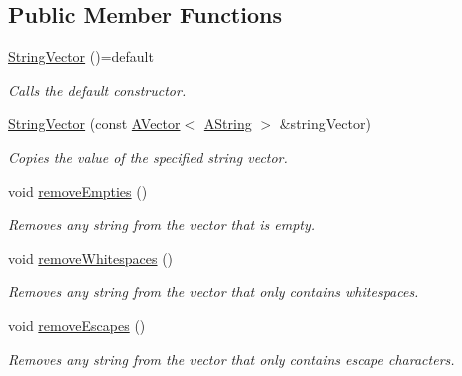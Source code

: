 \subsection*{Public Member Functions}
\begin{DoxyCompactItemize}
\item 
\mbox{\label{class_string_vector_a0ae8d9325b6d7be06f8681ef0181e07f}} 
\mbox{\hyperlink{class_string_vector_a0ae8d9325b6d7be06f8681ef0181e07f}{String\+Vector}} ()=default
\begin{DoxyCompactList}\small\item\em Calls the default constructor. \end{DoxyCompactList}\item 
\mbox{\hyperlink{class_string_vector_ab8b7a61d3ebe3c40e7c080bf68970ad2}{String\+Vector}} (const \mbox{\hyperlink{class_a_vector}{A\+Vector}}$<$ \mbox{\hyperlink{class_a_string}{A\+String}} $>$ \&string\+Vector)
\begin{DoxyCompactList}\small\item\em Copies the value of the specified string vector. \end{DoxyCompactList}\item 
\mbox{\label{class_string_vector_aa12fb0e9769a4f3903f7b97aca3b45f9}} 
void \mbox{\hyperlink{class_string_vector_aa12fb0e9769a4f3903f7b97aca3b45f9}{remove\+Empties}} ()
\begin{DoxyCompactList}\small\item\em Removes any string from the vector that is empty. \end{DoxyCompactList}\item 
\mbox{\label{class_string_vector_a9723199c06d3a1396aff0663d9ff7218}} 
void \mbox{\hyperlink{class_string_vector_a9723199c06d3a1396aff0663d9ff7218}{remove\+Whitespaces}} ()
\begin{DoxyCompactList}\small\item\em Removes any string from the vector that only contains whitespaces. \end{DoxyCompactList}\item 
\mbox{\label{class_string_vector_a7c39c268480229a8dbd7dea9ba5f33a8}} 
void \mbox{\hyperlink{class_string_vector_a7c39c268480229a8dbd7dea9ba5f33a8}{remove\+Escapes}} ()
\begin{DoxyCompactList}\small\item\em Removes any string from the vector that only contains escape characters. \end{DoxyCompactList}\end{DoxyCompactItemize}


